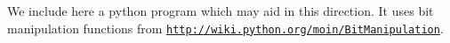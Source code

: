 We include here a python program which may aid in this direction. It uses bit manipulation functions from \href{{http://wiki.python.org/moin/BitManipulation}}{\nolinkurl{http://wiki.python.org/moin/BitManipulation}}.














































































































